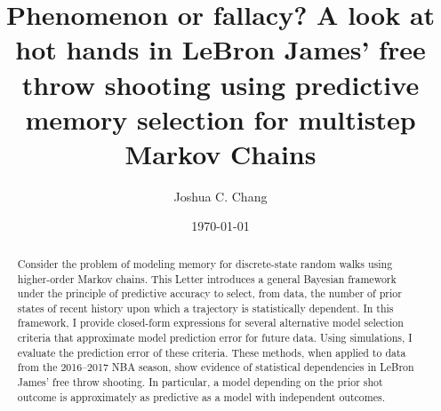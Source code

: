 \documentclass[prl,twocolumn,groupedaddress]{revtex4-1}
\begin{document}
\title[Memory determination in finite-state random walks]{Phenomenon or fallacy? A look at hot hands in LeBron James' free throw shooting using predictive memory selection for multistep Markov Chains}
\author{Joshua C. Chang}
\date{\today}                       

\begin{abstract}
Consider the problem of modeling memory for discrete-state random walks using higher-order Markov chains.  This Letter introduces a general Bayesian framework under the principle of predictive accuracy to select, from data, the number of prior states of recent history upon which a trajectory is statistically dependent. In this framework, I provide closed-form expressions for several alternative model selection criteria that approximate model prediction error for future data. Using simulations, I evaluate the prediction error of these criteria. These methods, when applied to data from the 2016--2017 NBA season, show evidence of statistical dependencies in LeBron James' free throw shooting. In particular, a model depending on the prior shot outcome is approximately as predictive as a model with independent outcomes.


\end{abstract}

\maketitle
\end{document}
